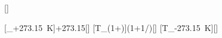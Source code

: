 [\degreeCelsius]

[\vartheta_+\SI{273.15}{\kelvin}]{\tiX+273.15}[\kelvin]
[T_\left(1+\right)]{\TiX*(1+1/\eKX)}[\kelvin]
[T_-\SI{273.15}{\kelvin}]{}[\degreeCelsius]

